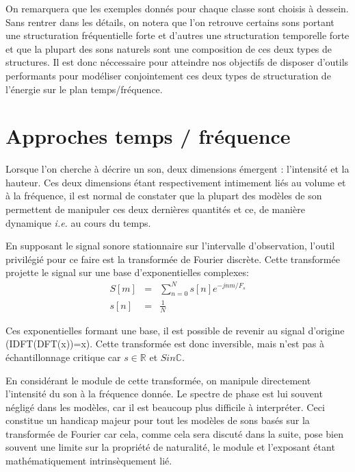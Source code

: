 On remarquera que les exemples donnés pour chaque classe sont choisis à dessein. Sans rentrer dans les détails, on notera que l'on retrouve certains sons portant une structuration fréquentielle forte et d'autres une structuration temporelle forte et que la plupart des sons naturels sont une composition de ces deux types de structures. Il est donc néccessaire pour atteindre nos objectifs de disposer d'outils performants pour modéliser conjointement ces deux types de structuration de l'énergie sur le plan temps/fréquence.

\section{Approches temps / fréquence} \label{sec:tf}

Lorsque l'on cherche à décrire un son, deux dimensions émergent : l'intensité et la hauteur. Ces deux dimensions étant respectivement intimement liés au volume et à la fréquence, il est normal de constater que la plupart des modèles de son permettent de manipuler ces deux dernières quantités et ce, de manière dynamique \textit{i.e.} au cours du temps.

En supposant le signal sonore stationnaire sur l'intervalle d'observation, l'outil privilégié pour ce faire est la transformée de Fourier discrète. Cette transformée projette le signal sur une base d'exponentielles complexes:
\begin{eqnarray}
  S[m] &=& \sum_{n=0}^{N} s[n] e^{-jnm/F_s} \\
  s[n] &=&\frac{1}{N}
\end{eqnarray}

Ces exponentielles formant une base, il est possible de revenir au signal d'origine (IDFT(DFT(x))=x). Cette transformée est donc inversible, mais n'est pas à échantillonnage critique car $s\in \mathbb{R}$  et $S in \mathbb{C}$.

En considérant le module de cette transformée, on manipule directement l'intensité du son à la fréquence donnée. Le spectre de phase est lui souvent négligé dans les modèles, car il est beaucoup plus difficile à interpréter. Ceci constitue un handicap majeur pour tout les modèles de sons basés sur la transformée de Fourier car cela, comme cela sera discuté dans la suite, pose bien souvent une limite sur la propriété de naturalité, le module et l'exposant étant mathématiquement intrinsèquement lié.

